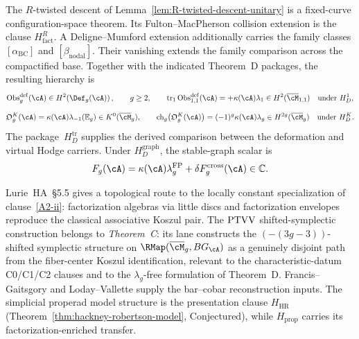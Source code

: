 \begin{remark}
The $R$-twisted descent of Lemma~\ref{lem:R-twisted-descent-unitary} is a
fixed-curve configuration-space theorem.  Its Fulton--MacPherson
collision extension is the clause $H_{\mathrm{fact}}^{R}$.  A
Deligne--Mumford extension additionally carries the family classes
$[\alpha_{\mathrm{BC}}]$ and $[\beta_{\mathrm{nodal}}]$.  Their
vanishing extends the family comparison across the compactified base.
Together with the indicated Theorem~D packages, the resulting hierarchy
is
\[
 \operatorname{Obs}^{\mathrm{def}}_g(\cA)
 \in H^2\!\left(\Def_g(\cA)\right),
 \qquad g\geq2,
 \qquad
 \operatorname{tr}_1\operatorname{Obs}^{\mathrm{def}}_{1,1}(\cA)
 =+\kappa(\cA)\lambda_1
 \in H^2(\overline{\cM}_{1,1})
 \quad\text{under }H_D^1,
\]
\[
 \mathfrak O_g^K(\cA)
 =\kappa(\cA)\lambda_{-1}(\mathbb E_g)
 \in K^0(\overline{\cM}_g),
 \qquad
 \operatorname{ch}_g\!\left(\mathfrak O_g^K(\cA)\right)
 =(-1)^g\kappa(\cA)\lambda_g
 \in H^{2g}(\overline{\cM}_g)
 \quad\text{under }H_D^K.
\]
The package~$H_D^{\mathrm{tr}}$ supplies the derived comparison between
the deformation and virtual Hodge carriers.  Under
$H_D^{\mathrm{graph}}$, the stable-graph scalar is
\[
 F_g(\cA)=\kappa(\cA)\lambda_g^{\mathrm{FP}}
 +\delta F_g^{\mathrm{cross}}(\cA)\in\mathbb C.
\]
\end{remark}

\begin{remark}
\label{rem:A-inf-2-ptvv-scope}
Lurie~HA~\S5.5 gives a topological route to the locally constant
specialization of clause~\ref{A2-ii}: factorization algebras via little
discs and factorization envelopes reproduce the classical associative
Koszul pair.  The $\mathrm{PTVV}$ shifted-symplectic construction belongs to
\emph{Theorem~C}: its lane
constructs the $(-(3g-3))$-shifted symplectic structure on
$\RMap(\overline{\cM}_g,BG_\cA)$ as a genuinely disjoint path from the
fiber-center Koszul identification, relevant to the characteristic-datum
C0/C1/C2 clauses and to the $\lambda_g$-free formulation of Theorem~D.
Francis--Gaitsgory and Loday--Vallette supply the bar--cobar
reconstruction inputs.  The simplicial properad model structure is the
presentation clause $H_{\mathrm{HR}}$
(Theorem~\ref{thm:hackney-robertson-model}, Conjectured), while
$H_{\mathrm{prop}}$ carries its factorization-enriched transfer.
\end{remark}

